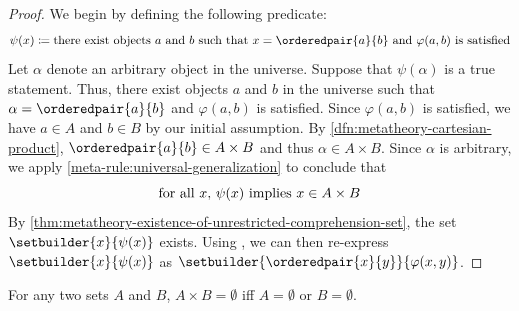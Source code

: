 \begin{proof}
    We begin by defining the following predicate:
    \begin{equation*}
        \psi(x) \coloneq \text{there exist objects \( a \) and \( b \) such that \( x = \orderedpair{a}{b} \) and \( \varphi(a, b) \) is satisfied}
    \end{equation*}
    Let \( \alpha \) denote an arbitrary object in the universe.
    Suppose that \( \psi(\alpha) \) is a true statement.
    Thus, there exist objects \( a \) and \( b \) in the universe such that \( \alpha = \orderedpair{a}{b} \) and \( \varphi(a, b) \) is satisfied.
    Since \( \varphi(a, b) \) is satisfied, we have \( a \in A \) and \( b \in B \) by our initial assumption.
    By \cref{dfn:metatheory-cartesian-product}, \( \orderedpair{a}{b} \in A \times B \) and thus \( \alpha \in A \times B \).
    Since \( \alpha \) is arbitrary, we apply \cref{meta-rule:universal-generalization} to conclude that
    \begin{equation*}
        \text{for all \( x \), \( \psi(x) \) implies \( x \in A \times B \)}
    \end{equation*}
    By \cref{thm:metatheory-existence-of-unrestricted-comprehension-set}, the set \( \setbuilder{x}{\psi(x)} \) exists.
    Using , we can then re-express
    \( \setbuilder{x}{\psi(x)} \) as \( \setbuilder{\orderedpair{x}{y}}{\varphi(x, y)} \).
\end{proof}

\begin{thm}
     \label{thm:metatheory-cartesian-product-is-empty-iff-at-least-one-of-the-sets-is-empty}
    For any two sets \( A \) and \( B \), \( A \times B = \emptyset \) iff \( A = \emptyset \) or \( B = \emptyset \).
\end{thm}


